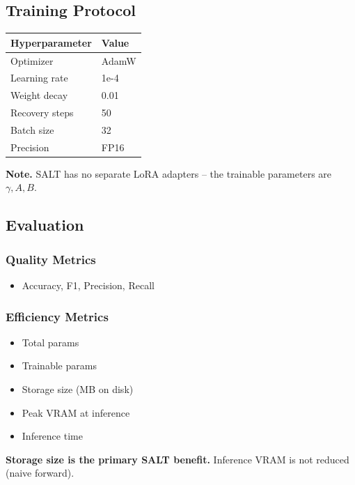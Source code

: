 \subsection{Training Protocol}

\begin{table}[H]
\centering
\small
\begin{tabular}{ll}
\toprule
\textbf{Hyperparameter} & \textbf{Value} \\
\midrule
Optimizer & AdamW \\
Learning rate & 1e-4 \\
Weight decay & 0.01 \\
Recovery steps & 50 \\
Batch size & 32 \\
Precision & FP16 \\
\bottomrule
\end{tabular}
\end{table}

\textbf{Note.} SALT has no separate LoRA adapters -- the trainable parameters are 
$\gamma, A, B$.

\subsection{Evaluation}

\subsubsection{Quality Metrics}

\begin{itemize}
\item Accuracy, F1, Precision, Recall

\end{itemize}
\subsubsection{Efficiency Metrics}

\begin{itemize}
\item Total params
\item Trainable params
\item Storage size (MB on disk)
\item Peak VRAM at inference
\item Inference time

\end{itemize}
\textbf{Storage size is the primary SALT benefit.} Inference VRAM is not reduced 
(naive forward).

